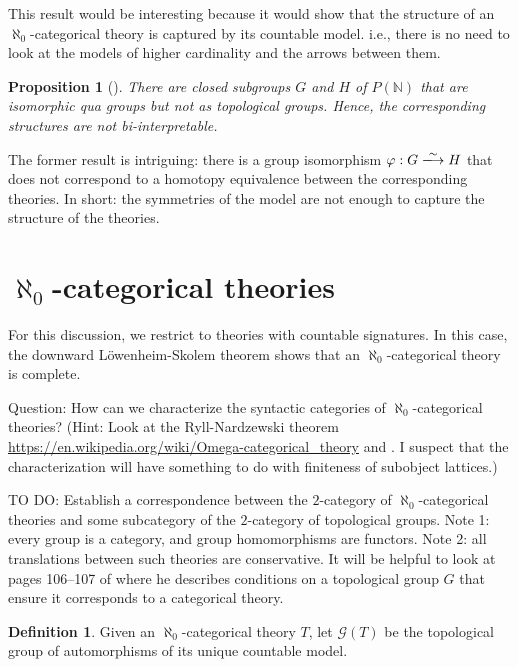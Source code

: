 \documentclass[12pt]{article}
\newtheorem{prop}{Proposition}
\theoremstyle{definition}
\newtheorem*{defn}{Definition}
\theoremstyle{remark}
\newcommand{\3}{\mathcal}
\begin{document}
This result would be interesting because it would show that the
structure of an $\aleph _0$-categorical theory is captured by its
countable model. i.e., there is no need to look at the models of
higher cardinality and the arrows between them.

\begin{prop}[\cite{evans1990}] There are closed subgroups $G$ and $H$
  of $P(\mathbb{N})$ that are isomorphic qua groups but not as
  topological groups. Hence, the corresponding structures are not
  bi-interpretable. \end{prop}

The former result is intriguing: there is a group isomorphism
$\varphi :G\xlongrightarrow{\sim} H$ that does not correspond to a
homotopy equivalence between the corresponding theories. In short: the
symmetries of the model are not enough to capture the structure of the
theories.

\section{$\aleph _0$-categorical theories}

For this discussion, we restrict to theories with countable
signatures. In this case, the downward L{\"o}wenheim-Skolem theorem
shows that an $\aleph _0$-categorical theory is complete.

Question: How can we characterize the syntactic categories of
$\aleph _0$-categorical theories? (Hint: Look at the Ryll-Nardzewski
theorem \url{https://en.wikipedia.org/wiki/Omega-categorical_theory}
and \citep[p 30]{cameron1990}. I suspect that the characterization
will have something to do with finiteness of subobject lattices.)

TO DO: Establish a correspondence between the $2$-category of
$\aleph _0$-categorical theories and some subcategory of the
$2$-category of topological groups. Note 1: every group is a category,
and group homomorphisms are functors.  Note 2: all translations
between such theories are conservative. It will be helpful to look at
pages 106--107 of \citep{cameron1990} where he describes conditions on
a topological group $G$ that ensure it corresponds to a categorical
theory.



\begin{defn} Given an $\aleph _0$-categorical theory $T$, let
  $\3G (T)$ be the topological group of automorphisms of its unique
  countable model. \end{defn}
\end{document}
